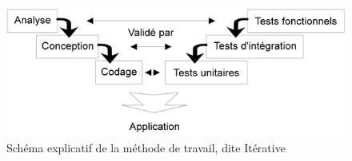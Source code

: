 \documentclass{bredele}
\begin{document}
\begin{figure}\centering
\includegraphics[width=\textwidth]{methodeITER.png}
\caption{Schéma explicatif de la méthode de travail, dite Itérative}
\begin{flushright}
\end{flushright}
\end{figure}
\newpage
\end{document}
